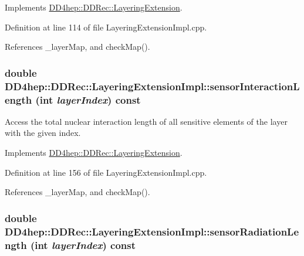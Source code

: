 Implements \hyperlink{class_d_d4hep_1_1_d_d_rec_1_1_layering_extension_adf915de4949eb6f0406045b4b38dd469}{DD4hep::DDRec::LayeringExtension}.

Definition at line 114 of file LayeringExtensionImpl.cpp.

References \_\-layerMap, and checkMap().\hypertarget{class_d_d4hep_1_1_d_d_rec_1_1_layering_extension_impl_a8746d049cc1aac662e60a1e72496f2e7}{
\subsubsection[{sensorInteractionLength}]{\setlength{\rightskip}{0pt plus 5cm}double DD4hep::DDRec::LayeringExtensionImpl::sensorInteractionLength (int {\em layerIndex}) const}}
\label{class_d_d4hep_1_1_d_d_rec_1_1_layering_extension_impl_a8746d049cc1aac662e60a1e72496f2e7}


Access the total nuclear interaction length of all sensitive elements of the layer with the given index. 

Implements \hyperlink{class_d_d4hep_1_1_d_d_rec_1_1_layering_extension_a99d3faa45e42d0a34635ea7f3ac2c038}{DD4hep::DDRec::LayeringExtension}.

Definition at line 156 of file LayeringExtensionImpl.cpp.

References \_\-layerMap, and checkMap().\hypertarget{class_d_d4hep_1_1_d_d_rec_1_1_layering_extension_impl_a50cbe11650ef7283353a6ba6a4f564e7}{
\subsubsection[{sensorRadiationLength}]{\setlength{\rightskip}{0pt plus 5cm}double DD4hep::DDRec::LayeringExtensionImpl::sensorRadiationLength (int {\em layerIndex}) const}}
\label{class_d_d4hep_1_1_d_d_rec_1_1_layering_extension_impl_a50cbe11650ef7283353a6ba6a4f564e7}


